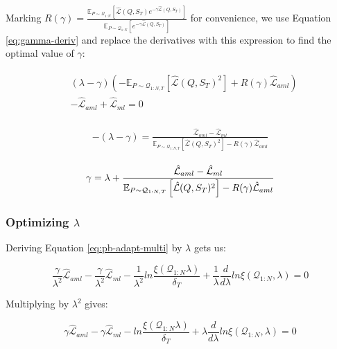 \documentclass{article}
\theoremstyle{definition}
\newcommand{\Expect}[2]{\mathbb{E}_{#1}\left [#2 \right ]}
\begin{document}
Marking $R(\gamma)=\frac{\Expect{P\sim \mathcal{Q}_{1:N}}{\hat{\mathcal{L}}(Q,S_T)e^{-\gamma\hat{\mathcal{L}}(Q,S_T)} }}{\Expect{P\sim \mathcal{Q}_{1:N}}{e^{-\gamma\hat{\mathcal{L}}(Q,S_T)}} }$ for convenience, we use Equation \ref{eq:gamma-deriv} and replace the derivatives with this expression to find the optimal value of $\gamma$: 

\begin{align*} 
\begin{split}
&(\lambda-\gamma)\left (-\Expect{P\sim \mathcal{Q}_{1:N,T}}{\hat{\mathcal{L}}(Q,S_T)^2}+R(\gamma)\hat{\mathcal{L}}_{aml}\right )\\& - \hat{\mathcal{L}}_{aml}+\hat{\mathcal{L}}_{ml} = 0
\end{split}
\end{align*}

\begin{align*} 
\begin{split}
-(\lambda-\gamma) = \frac{\hat{\mathcal{L}}_{aml}-\hat{\mathcal{L}}_{ml}}{\Expect{P\sim \mathcal{Q}_{1:N,T}}{\hat{\mathcal{L}}(Q,S_T)^2}-R(\gamma)\hat{\mathcal{L}}_{aml}}
\end{split}
\end{align*}

\begin{align} \label{eq:meta-pb-gamma}
\begin{split}
\gamma = \lambda+\frac{\hat{\mathcal{L}}_{aml}-\hat{\mathcal{L}}_{ml}}{\Expect{P\sim \mathcal{Q}_{1:N,T}}{\hat{\mathcal{L}}(Q,S_T)^2}-R(\gamma)\hat{\mathcal{L}}_{aml}}
\end{split}\hfill
\end{align}

\subsubsection{Optimizing $\lambda$}

Deriving Equation \ref{eq:pb-adapt-multi} by $\lambda$ gets us:

$$\frac{\gamma}{\lambda^2} \hat{\mathcal{L}}_{aml}-\frac{\gamma}{\lambda^2}\hat{\mathcal{L}}_{ml}-\frac{1}{\lambda^2}ln\frac{\xi(\mathcal{Q}_{1:N}\lambda)}{\delta_T}+\frac{1}{\lambda}\frac{d}{d\lambda}ln\xi(\mathcal{Q}_{1:N},\lambda)=0$$

Multiplying by $\lambda^2$ gives:

$$\gamma \hat{\mathcal{L}}_{aml}-\gamma\hat{\mathcal{L}}_{ml}-ln\frac{\xi(\mathcal{Q}_{1:N}\lambda)}{\delta_T}+\lambda\frac{d}{d\lambda}ln\xi(\mathcal{Q}_{1:N},\lambda)=0$$
\end{document}
